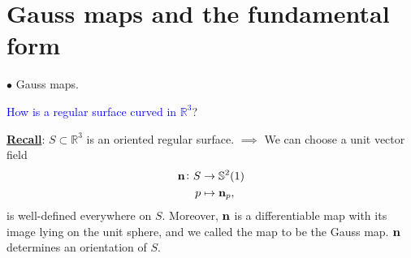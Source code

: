 \section{Gauss maps and the \texorpdfstring{}{2nd} fundamental form}
\(\bullet\) Gauss maps.
\begin{question}
    \textcolor{blue}{How is a regular surface curved in \(\mathbb{R}^3\)}? 
\end{question}
\underline{\textbf{Recall}}: \(S\subset\mathbb{R}^3\) is an oriented
regular surface. 
\(\implies\) We can choose a unit vector field 
    \begin{align*}
        \vb{n}\colon S&\to \mathbb{S}^2(1)\\
        p&\mapsto \vb{n}_p,
    \end{align*}
is well-defined everywhere on \(S\). Moreover, \(\vb{n}\) is a
differentiable map with its image lying on the unit sphere, and we 
called the map to be the Gauss map. \(\vb{n}\) determines an 
orientation of \(S\).
